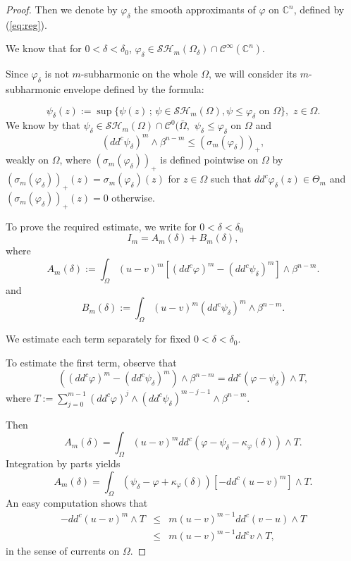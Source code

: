 \documentclass[12pt]{amsart}
\theoremstyle{definition}
\numberwithin{theorem}{section}
\numberwithin{equation}{section}
\newcommand{\C}{\mathbb{C}}
\begin{document}
{\begin{proof}
 Then we denote by $\varphi_{\delta}$ the smooth approximants of $\varphi $ on $\C^n$, defined by (\ref{eq:reg}).
    
  We know  that for $0 < \delta < \delta_0$, $\varphi_\delta \in  \mathcal{SH}_m (\Omega_{\delta})\cap\mathcal{C}^{\infty}(\mathbb C^n)$.
  
  
  Since $\varphi_\delta$ is not $m$-subharmonic on the whole  $\Omega$, we will consider  its $m$-subharmonic envelope defined by the formula:
  
  \begin{equation} 
  \psi_\delta (z) := \sup \{\psi (z) \, ; \, \psi \in \mathcal{SH}_m (\Omega), \psi \leq \varphi_\delta \, \, \text{on} \,\, \Omega\}, \, \, z \in \Omega.
  \end{equation} 
  We know by \cite[Theorem 3.3 ]{BZ20} that $\psi_\delta \in \mathcal{SH}_m (\Omega) \cap \mathcal{C}^0 (\bar{\Omega},$ $ \psi_\delta  \leq \varphi_\delta $ on $ \Omega$ and 
  \begin{equation} \label{eq:projection}
  (dd^c  \psi_\delta)^m \wedge \beta^{n-m} \leq (\sigma_m (\varphi_\delta))_+,
   \end{equation} 
  weakly on $\Omega$, where $(\sigma_m (\varphi_\delta))_+$ is defined pointwise on $\Omega$ by  $(\sigma_m (\varphi_\delta))_+(z) = \sigma_m (\varphi_\delta)(z)$ for $z \in  \Omega$ such that $dd^c \varphi_\delta (z) \in  \Theta_m$ and $(\sigma_m (\varphi_\delta))_+(z) = 0$ otherwise.
  
 
  To prove the required estimate, we write for $0 < \delta < \delta_0$
$$
I_m = A_m (\delta) + B_m (\delta),
$$
where
$$
A_m (\delta) := \int_{\Omega} (u - v)^m \left[ (dd^c\varphi)^m - (dd^c\psi_\delta)^m\right]\wedge\beta^{n-m}.
$$
and 
$$
B_m (\delta) := \int_{\Omega} (u - v)^m  (dd^c\psi_\delta)^m \wedge\beta^{n-m}.
$$

We estimate each term separately for fixed $0 < \delta < \delta_0$.

To estimate the first term, observe that
$$
\left( (dd^c\varphi)^m - (dd^c\psi_\delta)^m\right) \wedge  \beta^{n - m}= dd^c (\varphi - \psi_\delta) \wedge T,
$$
where $T := \sum_{j = 0}^{m -1} (dd^c \varphi)^j \wedge (dd^c \psi_\delta)^{m-j-1} \wedge\beta^{n - m}$.

Then
$$
A_m (\delta) = \int_{\Omega} (u - v)^m dd^c (\varphi - \psi_\delta - \kappa_\varphi(\delta)) \wedge T. 
$$
Integration by parts yields
$$
A_m (\delta) = \int_{\Omega}  (\psi_\delta - \varphi + \kappa_\varphi(\delta) ) \left[- dd^c (u - v)^m \right]\wedge T. 
$$
An easy computation shows that 
\begin{eqnarray} \label{eq:formalineq}
- dd^c (u - v)^m \wedge T & \leq &  m  (u - v)^{m-1} dd^c (v - u) \wedge T \\
&\leq & m  (u - v)^{m-1} dd^c v \wedge T, \nonumber
\end{eqnarray} 
in the sense of currents on $\Omega$.


\end{proof}}
\end{document}
